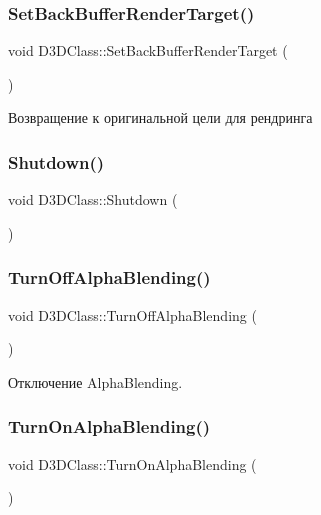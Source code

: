 \subsubsection{\texorpdfstring{Set\+Back\+Buffer\+Render\+Target()}{SetBackBufferRenderTarget()}}
{\footnotesize\ttfamily void D3\+D\+Class\+::\+Set\+Back\+Buffer\+Render\+Target (\begin{DoxyParamCaption}{ }\end{DoxyParamCaption})}



Возвращение к оригинальной цели для рендринга 

\mbox{\label{class_d3_d_class_a0765f6da66273e11c005d571d8dfbcb6}} 
\subsubsection{\texorpdfstring{Shutdown()}{Shutdown()}}
{\footnotesize\ttfamily void D3\+D\+Class\+::\+Shutdown (\begin{DoxyParamCaption}{ }\end{DoxyParamCaption})}

\mbox{\label{class_d3_d_class_ad5cd8ffba823780cbd4fe53adae4f6e8}} 
\subsubsection{\texorpdfstring{Turn\+Off\+Alpha\+Blending()}{TurnOffAlphaBlending()}}
{\footnotesize\ttfamily void D3\+D\+Class\+::\+Turn\+Off\+Alpha\+Blending (\begin{DoxyParamCaption}{ }\end{DoxyParamCaption})}



Отключение Alpha\+Blending. 

\mbox{\label{class_d3_d_class_acafeb301530c5dfe03f14e630f0a56db}} 
\subsubsection{\texorpdfstring{Turn\+On\+Alpha\+Blending()}{TurnOnAlphaBlending()}}
{\footnotesize\ttfamily void D3\+D\+Class\+::\+Turn\+On\+Alpha\+Blending (\begin{DoxyParamCaption}{ }\end{DoxyParamCaption})}




